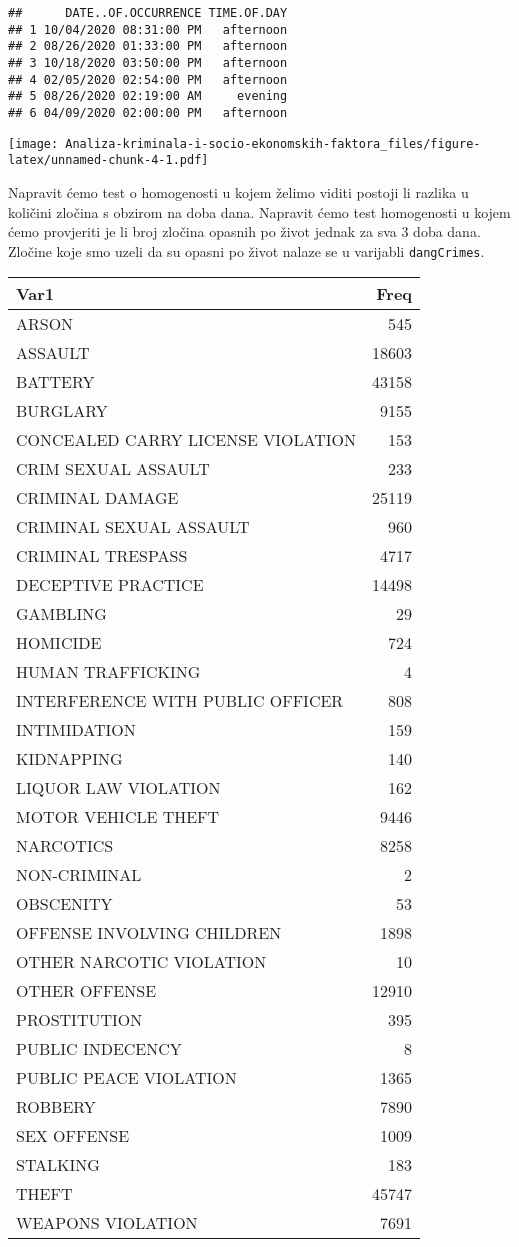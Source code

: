 \documentclass[
]{article}
\newenvironment{Shaded}{\begin{snugshade}}{\end{snugshade}}
\newcommand{\KeywordTok}[1]{\textcolor[rgb]{0.13,0.29,0.53}{\textbf{#1}}}
\newcommand{\NormalTok}[1]{#1}
\newcommand{\OperatorTok}[1]{\textcolor[rgb]{0.81,0.36,0.00}{\textbf{#1}}}
\begin{document}
\begin{verbatim}
##      DATE..OF.OCCURRENCE TIME.OF.DAY
## 1 10/04/2020 08:31:00 PM   afternoon
## 2 08/26/2020 01:33:00 PM   afternoon
## 3 10/18/2020 03:50:00 PM   afternoon
## 4 02/05/2020 02:54:00 PM   afternoon
## 5 08/26/2020 02:19:00 AM     evening
## 6 04/09/2020 02:00:00 PM   afternoon
\end{verbatim}

\begin{Shaded}
\end{Shaded}

\texttt{[image: Analiza-kriminala-i-socio-ekonomskih-faktora\_files/figure-latex/unnamed-chunk-4-1.pdf]}

Napravit ćemo test o homogenosti u kojem želimo viditi postoji li
razlika u količini zločina s obzirom na doba dana. Napravit ćemo test
homogenosti u kojem ćemo provjeriti je li broj zločina opasnih po život
jednak za sva 3 doba dana. Zločine koje smo uzeli da su opasni po život
nalaze se u varijabli \texttt{dangCrimes}.

\begin{longtable}[]{@{}lr@{}}
\toprule
Var1 & Freq\tabularnewline
\midrule
\endhead
ARSON & 545\tabularnewline
ASSAULT & 18603\tabularnewline
BATTERY & 43158\tabularnewline
BURGLARY & 9155\tabularnewline
CONCEALED CARRY LICENSE VIOLATION & 153\tabularnewline
CRIM SEXUAL ASSAULT & 233\tabularnewline
CRIMINAL DAMAGE & 25119\tabularnewline
CRIMINAL SEXUAL ASSAULT & 960\tabularnewline
CRIMINAL TRESPASS & 4717\tabularnewline
DECEPTIVE PRACTICE & 14498\tabularnewline
GAMBLING & 29\tabularnewline
HOMICIDE & 724\tabularnewline
HUMAN TRAFFICKING & 4\tabularnewline
INTERFERENCE WITH PUBLIC OFFICER & 808\tabularnewline
INTIMIDATION & 159\tabularnewline
KIDNAPPING & 140\tabularnewline
LIQUOR LAW VIOLATION & 162\tabularnewline
MOTOR VEHICLE THEFT & 9446\tabularnewline
NARCOTICS & 8258\tabularnewline
NON-CRIMINAL & 2\tabularnewline
OBSCENITY & 53\tabularnewline
OFFENSE INVOLVING CHILDREN & 1898\tabularnewline
OTHER NARCOTIC VIOLATION & 10\tabularnewline
OTHER OFFENSE & 12910\tabularnewline
PROSTITUTION & 395\tabularnewline
PUBLIC INDECENCY & 8\tabularnewline
PUBLIC PEACE VIOLATION & 1365\tabularnewline
ROBBERY & 7890\tabularnewline
SEX OFFENSE & 1009\tabularnewline
STALKING & 183\tabularnewline
THEFT & 45747\tabularnewline
WEAPONS VIOLATION & 7691\tabularnewline
\bottomrule
\end{longtable}
\end{document}
